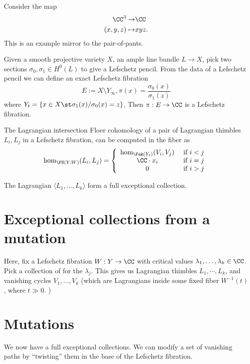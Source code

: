 \begin{example}
  Consider the map 
  \begin{align*}
  \CC^3\to & \CC\\
  (x, y, z) \mapsto & xyz.
  \end{align*}
  This is an example mirror to the pair-of-pants.
\end{example}
\begin{example}
Given a smooth projective variety $X$, an ample line bundle $L\to X$, pick two sections $\sigma_0, \sigma_1\in H^0(L)$ to give a Lefschetz pencil. From the data of a Lefschetz pencil we can define an exact Lefschetz fibration 
\[E:=X\setminus Y_\infty, \pi(x)=\frac{\sigma_0(x)}{\sigma_1(z)}\]
where $Y_t=\{x\in X \st \sigma_1(x)/\sigma_0(x)=z\}$, 
Then $\pi: E\to \CC$ is a Lefschetz fibration. 
\end{example}
\begin{theorem}
  The Lagrangian intersection Floer cohomology of a pair of Lagrangian thimbles
  $L_i, L_j$ in a Lefschetz fibration,
  can be computed in the fiber as 
  \[\hom_{\FS(Y, W)}(L_i, L_j)= \left\{\begin{array}{cc}\hom_{\Fuk(Y_t)}(V_i, V_j) & \text{ if } i<j \\
    \CC\cdot x_i & \text{ if } i=j\\
    0 & \text{ if } i>j
  \end{array}\right.
  \]
\end{theorem}
\begin{corollary}
  The Lagrangian $\langle L_1, \ldots, L_k\rangle$ form a full exceptional collection. 
\end{corollary}

\section{Exceptional collections from a mutation}
Here, fix a Lefschetz fibration $W: Y\to \CC$ with critical values $\lambda_1, \ldots, \lambda_k\in \CC$. Pick a collection of  for the $\lambda_j$. This gives us Lagrangian thimbles $L_1, \cdots, L_k$, and vanishing cycles $V_1, \ldots, V_k$ (which are Lagrangians inside some fixed fiber $W^{-1}(t)$, where $t\gg 0$. )
\section{Mutations}
We now have a full exceptional collections. We can modify a set of vanishing paths by ``twisting'' them in the base of the Lefschetz fibration.

